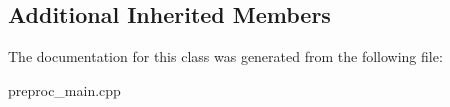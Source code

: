 \subsection*{Additional Inherited Members}


The documentation for this class was generated from the following file\+:\begin{DoxyCompactItemize}
\item 
preproc\+\_\+main.\+cpp\end{DoxyCompactItemize}
